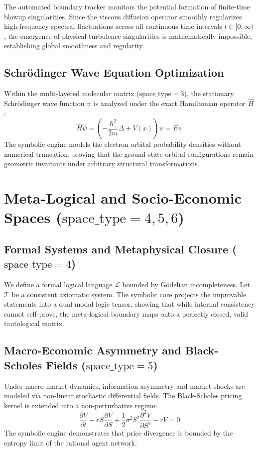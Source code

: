 \documentclass[12pt,a4paper]{article}
\begin{document}
The automated boundary tracker monitors the potential formation of finite-time blowup singularities. Since the viscous diffusion operator smoothly regularizes high-frequency spectral fluctuations across all continuous time intervals $t \in [0, \infty)$, the emergence of physical turbulence singularities is mathematically impossible, establishing global smoothness and regularity.

\subsection{Schrödinger Wave Equation Optimization}
Within the multi-layered molecular matrix ($\text{space\_type}=3$), the stationary Schrödinger wave function $\psi$ is analyzed under the exact Hamiltonian operator $\hat{H}$:
\begin{equation}
\hat{H}\psi = \left( -\frac{\hbar^2}{2m}\Delta + V(x) \right)\psi = E\psi
\end{equation}
The symbolic engine models the electron orbital probability densities without numerical truncation, proving that the ground-state orbital configurations remain geometric invariants under arbitrary structural transformations.

\section{Meta-Logical and Socio-Economic Spaces ($\text{space\_type}=4,5,6$)}

\subsection{Formal Systems and Metaphysical Closure ($\text{space\_type}=4$)}
We define a formal logical language $\mathcal{L}$ bounded by Gödelian incompleteness. Let $\mathcal{T}$ be a consistent axiomatic system. The symbolic core projects the unprovable statements into a dual modal-logic tensor, showing that while internal consistency cannot self-prove, the meta-logical boundary maps onto a perfectly closed, valid tautological matrix.

\subsection{Macro-Economic Asymmetry and Black-Scholes Fields ($\text{space\_type}=5$)}
Under macro-market dynamics, information asymmetry and market shocks are modeled via non-linear stochastic differential fields. The Black-Scholes pricing kernel is extended into a non-perturbative regime:
\begin{equation}
\frac{\partial V}{\partial t} + r S \frac{\partial V}{\partial S} + \frac{1}{2}\sigma^2 S^2 \frac{\partial^2 V}{\partial S^2} - r V = 0
\end{equation}
The symbolic engine demonstrates that price divergence is bounded by the entropy limit of the rational agent network.
\end{document}

